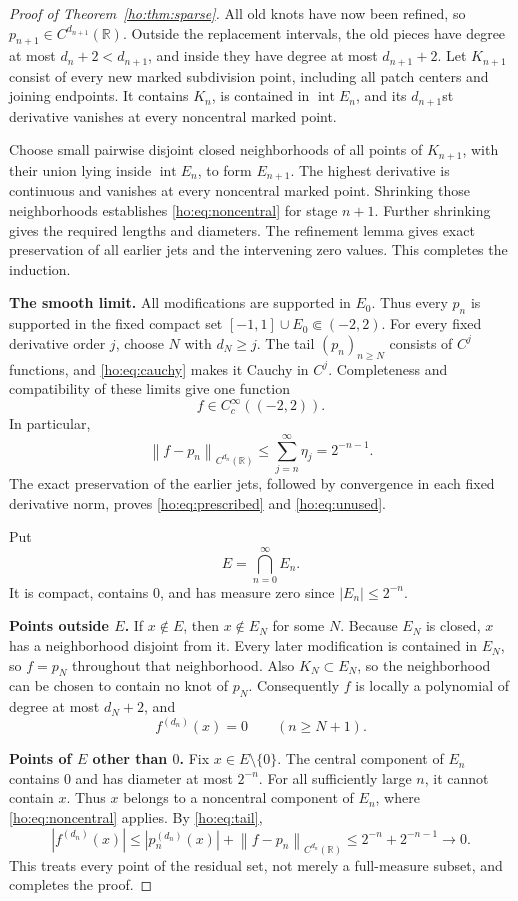 \documentclass[11pt,reqno]{amsart}
\numberwithin{equation}{section}
\theoremstyle{definition}
\theoremstyle{remark}
\newcommand{\R}{\mathbb R}
\newcommand{\norm}[1]{\left\lVert #1\right\rVert}
\newcommand{\inter}{\operatorname{int}}
\begin{document}
\begin{proof}[Proof of Theorem~\ref{ho:thm:sparse}]
All old knots have now been refined, so $p_{n+1}\in C^{d_{n+1}}(\R)$. Outside the replacement intervals, the old pieces have degree at most $d_n+2<d_{n+1}$, and inside they have degree at most $d_{n+1}+2$. Let $K_{n+1}$ consist of every new marked subdivision point, including all patch centers and joining endpoints. It contains $K_n$, is contained in $\inter E_n$, and its $d_{n+1}$st derivative vanishes at every noncentral marked point.

Choose small pairwise disjoint closed neighborhoods of all points of $K_{n+1}$, with their union lying inside $\inter E_n$, to form $E_{n+1}$. The highest derivative is continuous and vanishes at every noncentral marked point. Shrinking those neighborhoods establishes \eqref{ho:eq:noncentral} for stage $n+1$. Further shrinking gives the required lengths and diameters. The refinement lemma gives exact preservation of all earlier jets and the intervening zero values. This completes the induction.

\smallskip\noindent\textbf{The smooth limit.}
All modifications are supported in $E_0$. Thus every $p_n$ is supported in the fixed compact set $[-1,1]\cup E_0\Subset(-2,2)$. For every fixed derivative order $j$, choose $N$ with $d_N\ge j$. The tail $(p_n)_{n\ge N}$ consists of $C^j$ functions, and \eqref{ho:eq:cauchy} makes it Cauchy in $C^j$. Completeness and compatibility of these limits give one function
\[
 f\in C_c^\infty((-2,2)).
\]
In particular,
\begin{equation}\label{ho:eq:tail}
 \norm{f-p_n}_{C^{d_n}(\R)}
 \le\sum_{j=n}^{\infty}\eta_j=2^{-n-1}.
\end{equation}
The exact preservation of the earlier jets, followed by convergence in each fixed derivative norm, proves \eqref{ho:eq:prescribed} and \eqref{ho:eq:unused}.

Put
\[
 E=\bigcap_{n=0}^{\infty}E_n.
\]
It is compact, contains $0$, and has measure zero since $|E_n|\le2^{-n}$.

\smallskip\noindent\textbf{Points outside $E$.}
If $x\notin E$, then $x\notin E_N$ for some $N$. Because $E_N$ is closed, $x$ has a neighborhood disjoint from it. Every later modification is contained in $E_N$, so $f=p_N$ throughout that neighborhood. Also $K_N\subset E_N$, so the neighborhood can be chosen to contain no knot of $p_N$. Consequently $f$ is locally a polynomial of degree at most $d_N+2$, and
\[
 f^{(d_n)}(x)=0\qquad(n\ge N+1).
\]

\smallskip\noindent\textbf{Points of $E$ other than $0$.}
Fix $x\in E\setminus\{0\}$. The central component of $E_n$ contains $0$ and has diameter at most $2^{-n}$. For all sufficiently large $n$, it cannot contain $x$. Thus $x$ belongs to a noncentral component of $E_n$, where \eqref{ho:eq:noncentral} applies. By \eqref{ho:eq:tail},
\[
 |f^{(d_n)}(x)|
 \le |p_n^{(d_n)}(x)|+\norm{f-p_n}_{C^{d_n}(\R)}
 \le 2^{-n}+2^{-n-1}\longrightarrow0.
\]
This treats every point of the residual set, not merely a full-measure subset, and completes the proof.
\end{proof}
\end{document}
